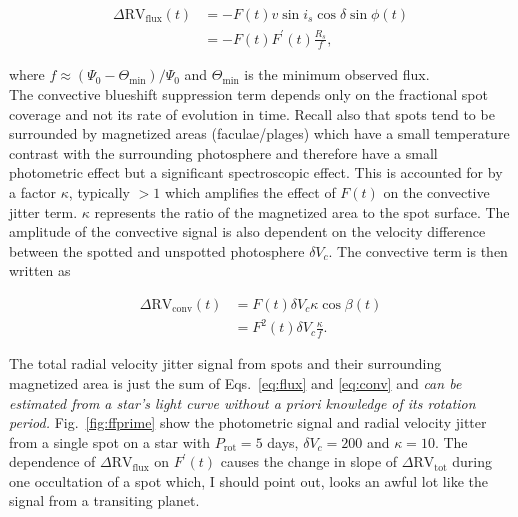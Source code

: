 \begin{align}
\Delta \mathrm{RV_{flux}} (t) &= -F(t) v \sin{i_s} \cos{\delta} \sin{\phi(t)} \\
&= -F(t) F^{'}(t) \frac{R_s}{f}, \label{eq:flux}
\end{align}

\noindent where $f\approx (\Psi_0 - \Theta_{\mathrm{min}}) / \Psi_0$ and $\Theta_{\mathrm{min}}$ is the 
minimum observed flux. \\

The convective blueshift suppression term depends only on the fractional spot coverage and 
not its rate of evolution in time. Recall also that spots tend to be surrounded by magnetized areas 
(faculae/plages) 
which have a small temperature contrast with the surrounding photosphere and therefore have a small 
photometric effect but a significant spectroscopic effect. This is accounted for by a factor $\kappa$, 
typically $>1$ which amplifies the effect of $F(t)$ on the convective 
jitter term. $\kappa$ represents the ratio of 
the magnetized area to the spot surface. The amplitude of the convective signal 
is also dependent on the velocity difference between the spotted and unspotted photosphere $\delta V_c$. 
The convective term is then written as 

\begin{align}
\Delta \mathrm{RV_{conv}} (t) &= F(t) \delta V_c \kappa \cos{\beta(t)} \\
&= F^{2}(t) \delta V_c \frac{\kappa}{f}. \label{eq:conv}
\end{align}

\noindent The total radial velocity jitter signal from spots and their surrounding magnetized area is just the 
sum of Eqs.~\ref{eq:flux} and \ref{eq:conv} and \emph{can be estimated from a star's light curve 
without a priori knowledge of its rotation period.} Fig.~\ref{fig:ffprime} show the photometric 
signal and radial velocity jitter from a single spot on a star with $P_{\mathrm{rot}} = 5$ days, $\delta V_c = 200$ 
\mps{,} and $\kappa=10$. The dependence of $\Delta \mathrm{RV_{flux}}$ on $F^{'}(t)$ causes the change 
in slope of $\Delta \mathrm{RV_{tot}}$ during one occultation of a spot which, I should point out, 
looks an awful lot like the signal from a transiting planet. \\

